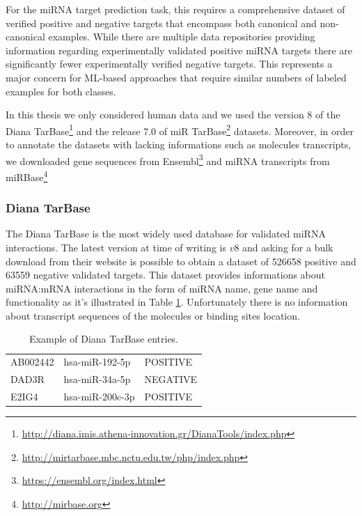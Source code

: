 For the miRNA target prediction task, this requires a comprehensive dataset of verified positive and negative targets that encompass both canonical and non-canonical examples. While there are multiple data repositories providing information regarding experimentally validated positive miRNA targets\cite{dianatarbase} \cite{mirtarbase} there are significantly fewer experimentally verified negative targets. This represents a major concern for ML-based approaches that require similar numbers of labeled examples for both classes.

In this thesis we only considered human data and we used the version 8 of the Diana TarBase\footnote{\url{http://diana.imis.athena-innovation.gr/DianaTools/index.php}} and the release 7.0 of miR TarBase\footnote{\url{http://mirtarbase.mbc.nctu.edu.tw/php/index.php}} datasets. Moreover, in order to annotate the datasets with lacking informations such as molecules transcripts, we downloaded gene sequences from Ensembl\footnote{\url{https://ensembl.org/index.html}} and miRNA transcripts from miRBase\footnote{\url{http://mirbase.org}} 

\subsubsection{Diana TarBase}
The Diana TarBase is the most widely used database for validated miRNA interactions. The latest version at time of writing is $v8$ and asking for a bulk download from their website is possible to obtain a dataset of 526658 positive and 63559 negative validated targets. This dataset provides informations about miRNA:mRNA interactions in the form of miRNA name, gene name and functionality as it's illustrated in Table \ref{tab:Diana}. Unfortunately there is no information about transcript sequences of the molecules or binding sites location.

\begin{table}[!t]
	\caption{Example of Diana TarBase entries.}
	\label{tab:Diana}
	\centering
	\begin{tabular}{l l l}
		\toprule
		\tabhead{gene name} & \tabhead{miRNA name} & \tabhead{functionality} \\
		\midrule
		AB002442 & hsa-miR-192-5p & POSITIVE\\
		DAD3R & hsa-miR-34a-5p & NEGATIVE\\
		E2IG4 & hsa-miR-200c-3p & POSITIVE\\
		\bottomrule
	\end{tabular}
\end{table}

